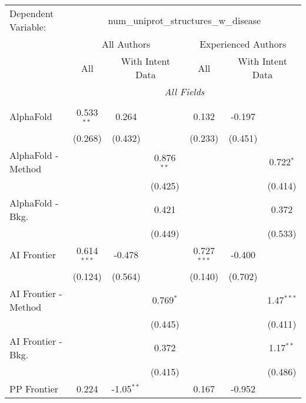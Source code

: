 \begingroup
\centering
\begin{tabular}{lcccccc}
   \tabularnewline \midrule \midrule
   Dependent Variable: & \multicolumn{6}{c}{num\_uniprot\_structures\_w\_disease}\\
 & \multicolumn{3}{c}{All Authors} & \multicolumn{3}{c}{Experienced Authors} \\
\cmidrule(lr){2-4} \cmidrule(lr){5-7}
 & \multicolumn{1}{c}{All} & \multicolumn{2}{c}{With Intent Data} & \multicolumn{1}{c}{All} & \multicolumn{2}{c}{With Intent Data} \\
\cmidrule(lr){2-2} \cmidrule(lr){3-4} \cmidrule(lr){5-5} \cmidrule(lr){6-7}
 & \multicolumn{6}{c}{\textit{All Fields}} \\ \\
   AlphaFold            & 0.533$^{**}$  & 0.264        &              & 0.132         & -0.197  &   \\   
                        & (0.268)       & (0.432)      &              & (0.233)       & (0.451) &   \\   
   AlphaFold - Method   &               &              & 0.876$^{**}$ &               &         & 0.722$^{*}$\\   
                        &               &              & (0.425)      &               &         & (0.414)\\   
   AlphaFold - Bkg.     &               &              & 0.421        &               &         & 0.372\\   
                        &               &              & (0.449)      &               &         & (0.533)\\   
   AI Frontier          & 0.614$^{***}$ & -0.478       &              & 0.727$^{***}$ & -0.400  &   \\   
                        & (0.124)       & (0.564)      &              & (0.140)       & (0.702) &   \\   
   AI Frontier - Method &               &              & 0.769$^{*}$  &               &         & 1.47$^{***}$\\   
                        &               &              & (0.445)      &               &         & (0.411)\\   
   AI Frontier - Bkg.   &               &              & 0.372        &               &         & 1.17$^{**}$\\   
                        &               &              & (0.415)      &               &         & (0.486)\\   
   PP Frontier          & 0.224         & -1.05$^{**}$ &              & 0.167         & -0.952  &   \\   

\end{tabular}
